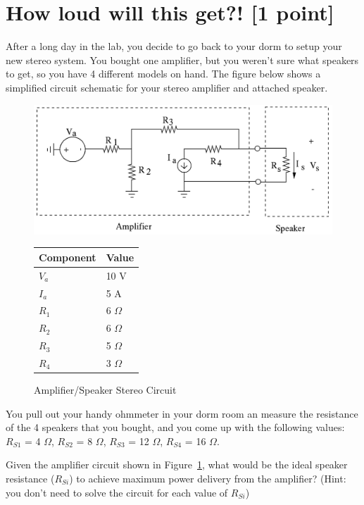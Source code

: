 %

\section{How loud will this get?! [1 point]}
After a long day in the lab, you decide to go back to your dorm to setup
your new stereo system.  You bought one amplifier, but you weren't sure what
speakers to get, so you have 4 different models on hand.  The figure below
shows a simplified circuit schematic for your stereo amplifier and attached speaker.

\begin{figure}[h!]
\begin{minipage}[l]{0.8\linewidth}
\centering
\includegraphics[width=5.0in]{p4/p4}
\caption{Amplifier/Speaker Stereo Circuit}
\label{fig:stereo}
\end{minipage}\hfill
\begin{minipage}[l]{0.2\linewidth}
\vspace*{-0.5in}
\begin{tabular}{|l|l|} \hline
Component & Value \\ \hline
$V_a$ & 10 V \\ \hline
$I_a$ & 5 A \\ \hline
$R_1$ & 6 $\Omega$ \\ \hline
$R_2$ & 6 $\Omega$ \\ \hline
$R_3$ & 5 $\Omega$ \\ \hline
$R_4$ & 3 $\Omega$ \\ \hline
\end{tabular}
\end{minipage}
\end{figure}

You pull out your handy ohmmeter in your dorm room an measure the resistance of
the 4 speakers that you bought, and you come up with the following values: $R_{S1}$ = 4 $\Omega$, $R_{S2}$ = 8 $\Omega$, $R_{S3}$ = 12 $\Omega$, $R_{S4}$ = 16 $\Omega$.

Given the amplifier circuit shown in Figure~\ref{fig:stereo}, what would
be the ideal speaker resistance ($R_{Si}$) to achieve maximum power delivery
from the amplifier?  (Hint: you don't need to solve the circuit for each value of $R_{Si}$)
\newpage
